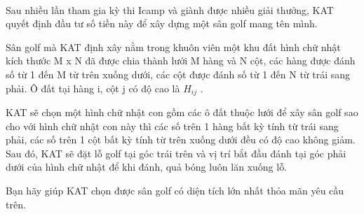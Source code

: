  

Sau nhiều lần tham gia kỳ thi Icamp và giành được nhiều giải thưởng, KAT quyết định đầu tư số tiền này để xây dựng một sân golf mang tên mình.

Sân golf mà KAT định xây nằm trong khuôn viên một khu đất hình chữ nhật kích thước M x N đã được chia thành lưới M hàng và N cột, các hàng được đánh số từ 1 đến M từ trên xuống dưới, các cột được đánh số từ 1 đến N từ trái sang phải. Ô đất tại hàng i, cột j có độ cao là $H_{ij}$ .

KAT sẽ chọn một hình chữ nhật con gồm các ô đất thuộc lưới để xây sân golf sao cho với hình chữ nhật con này thì các số trên 1 hàng bất kỳ tính từ trái sang phải, các số trên 1 cột bất kỳ tính từ trên xuống dưới đều có độ cao không giảm. Sau đó, KAT sẽ đặt lỗ golf tại góc trái trên và vị trí bắt đầu đánh tại góc phải dưới của hình chữ nhật để khi đánh, quả bóng luôn lăn xuống lỗ.

Bạn hãy giúp KAT chọn được sân golf có diện tích lớn nhất thỏa mãn yêu cầu trên.